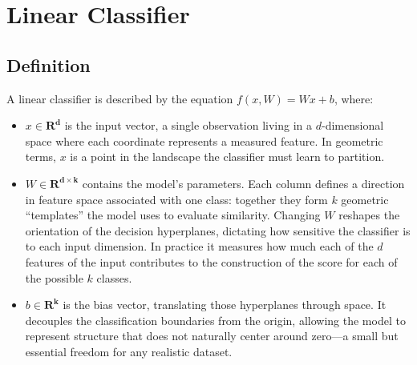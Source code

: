 \section{Linear Classifier}
\subsection{Definition}
A linear classifier is described by the equation $f(x,W)=Wx+b$, where:  \\
\begin{itemize}
    \item $x \in \mathbf{R^d}$ is the input vector, a single observation living in a $d$-dimensional space where each coordinate represents a measured feature. In geometric terms, $x$ is a point in the landscape the classifier must learn to partition.
    
    \item $W \in \mathbf{R^{d \times k}}$ contains the model’s parameters. Each column defines a direction in feature space associated with one class: together they form $k$ geometric “templates” the model uses to evaluate similarity. Changing $W$ reshapes the orientation of the decision hyperplanes, dictating how sensitive the classifier is to each input dimension. In practice it measures how much each of the $d$ features of the input contributes to the construction of the score for each of the possible $k$ classes.
    
    \item $b \in \mathbf{R^k}$ is the bias vector, translating those hyperplanes through space. It decouples the classification boundaries from the origin, allowing the model to represent structure that does not naturally center around zero—a small but essential freedom for any realistic dataset.
\end{itemize}
